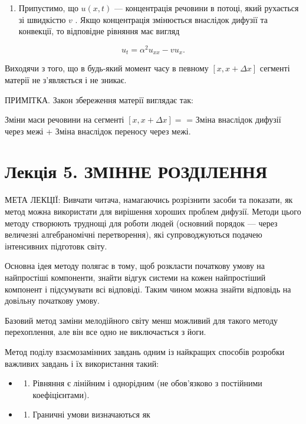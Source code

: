 \documentclass[
  ukrainian,
]{article}
\providecommand{\tightlist}{%
  \setlength{\itemsep}{0pt}\setlength{\parskip}{0pt}}
\begin{document}
\begin{enumerate}
\def\labelenumi{\arabic{enumi}.}
\setcounter{enumi}{3}
\tightlist
\item
  Припустимо, що \(u(x,t)\) --- концентрація речовини в потоці, який
  рухається зі швидкістю \(v\) . Якщо концентрація змінюється внаслідок
  дифузії та конвекції, то відповідне рівняння має вигляд
\end{enumerate}

\[
u_t = \alpha^2 u_{xx} - v u_x.
\]

Виходячи з того, що в будь-який момент часу в певному
\([x, x + \Delta x]\) сегменті матерії не з'являється і не зникає.

ПРИМІТКА. Закон збереження матерії виглядає так:

Зміни маси речовини на сегменті \([x, x + \Delta x] =\) = Зміна
внаслідок дифузії через межі + Зміна внаслідок переносу через межі.

\section{Лекція 5. ЗМІННЕ
РОЗДІЛЕННЯ}\label{ux43bux435ux43aux446ux456ux44f-5.-ux437ux43cux456ux43dux43dux435-ux440ux43eux437ux434ux456ux43bux435ux43dux43dux44f}

МЕТА ЛЕКЦІЇ: Вивчати читача, намагаючись розрізнити засоби та показати,
як метод можна використати для вирішення хороших проблем дифузії. Методи
цього методу створюють труднощі для роботи людей (основний порядок ---
через величезні алгебраномічні перетворення), які супроводжуються
подачею інтенсивних підготовк світу.

Основна ідея методу полягає в тому, щоб розкласти початкову умову на
найпростіші компоненти, знайти відгук системи на кожен найпростіший
компонент і підсумувати всі відповіді. Таким чином можна знайти
відповідь на довільну початкову умову.

Базовий метод заміни мелодійного світу менш можливий для такого методу
перехоплення, але він все одно не виключається з йоги.

Метод поділу взаємозамінних завдань одним із найкращих способів розробки
важливих завдань і їх використання такий:

\begin{itemize}
\tightlist
\item
  \begin{enumerate}
  \def\labelenumi{\arabic{enumi}.}
  \tightlist
  \item
    Рівняння є лінійним і однорідним (не обов'язково з постійними
    коефіцієнтами).
  \end{enumerate}
\item
  \begin{enumerate}
  \def\labelenumi{\arabic{enumi}.}
  \setcounter{enumi}{1}
  \tightlist
  \item
    Граничні умови визначаються як
  \end{enumerate}
\end{itemize}
\end{document}
